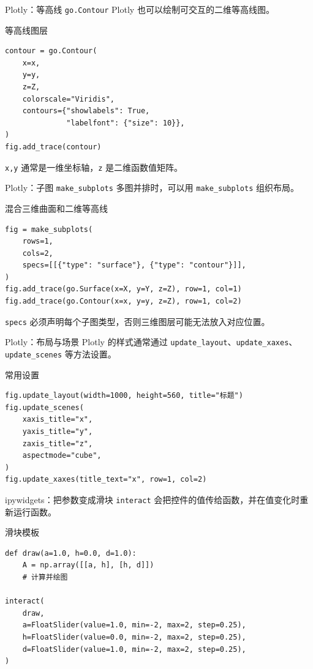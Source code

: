 \documentclass[aspectratio=169,11pt]{ctexbeamer}
\begin{document}
\begin{frame}[fragile]{Plotly：等高线 \texttt{go.Contour}}
  Plotly 也可以绘制可交互的二维等高线图。

  \begin{block}{等高线图层}
\begin{Verbatim}[fontsize=\small]
contour = go.Contour(
    x=x,
    y=y,
    z=Z,
    colorscale="Viridis",
    contours={"showlabels": True,
              "labelfont": {"size": 10}},
)
fig.add_trace(contour)
\end{Verbatim}
  \end{block}

  \texttt{x,y} 通常是一维坐标轴，\texttt{z} 是二维函数值矩阵。
\end{frame}

\begin{frame}[fragile]{Plotly：子图 \texttt{make\_subplots}}
  多图并排时，可以用 \texttt{make\_subplots} 组织布局。

  \begin{block}{混合三维曲面和二维等高线}
\begin{Verbatim}[fontsize=\small]
fig = make_subplots(
    rows=1,
    cols=2,
    specs=[[{"type": "surface"}, {"type": "contour"}]],
)
fig.add_trace(go.Surface(x=X, y=Y, z=Z), row=1, col=1)
fig.add_trace(go.Contour(x=x, y=y, z=Z), row=1, col=2)
\end{Verbatim}
  \end{block}

  \texttt{specs} 必须声明每个子图类型，否则三维图层可能无法放入对应位置。
\end{frame}

\begin{frame}[fragile]{Plotly：布局与场景}
  Plotly 的样式通常通过 \texttt{update\_layout}、\texttt{update\_xaxes}、\texttt{update\_scenes} 等方法设置。

  \begin{block}{常用设置}
\begin{Verbatim}[fontsize=\small]
fig.update_layout(width=1000, height=560, title="标题")
fig.update_scenes(
    xaxis_title="x",
    yaxis_title="y",
    zaxis_title="z",
    aspectmode="cube",
)
fig.update_xaxes(title_text="x", row=1, col=2)
\end{Verbatim}
  \end{block}
\end{frame}

\begin{frame}[fragile]{ipywidgets：把参数变成滑块}
  \texttt{interact} 会把控件的值传给函数，并在值变化时重新运行函数。

  \begin{block}{滑块模板}
\begin{Verbatim}[fontsize=\small]
def draw(a=1.0, h=0.0, d=1.0):
    A = np.array([[a, h], [h, d]])
    # 计算并绘图

interact(
    draw,
    a=FloatSlider(value=1.0, min=-2, max=2, step=0.25),
    h=FloatSlider(value=0.0, min=-2, max=2, step=0.25),
    d=FloatSlider(value=1.0, min=-2, max=2, step=0.25),
)
\end{Verbatim}
  \end{block}
\end{frame}
\end{document}

